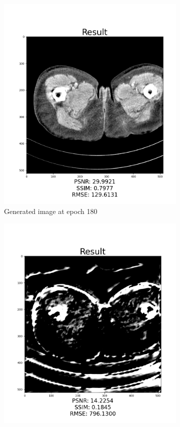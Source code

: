\documentclass[journal]{IEEEtran}
\begin{document}
\begin{figure}
\begin{subfigure}[t]{0.22\textwidth}
         \includegraphics[width=\textwidth]{epoch180}
         \caption{Generated image at epoch 180}
         \label{epoch180}
     \end{subfigure}
     \begin{subfigure}[t]{0.22\textwidth}
         \centering
         \includegraphics[width=\textwidth]{epoch200}

\end{subfigure}
\end{figure}
\end{document}
